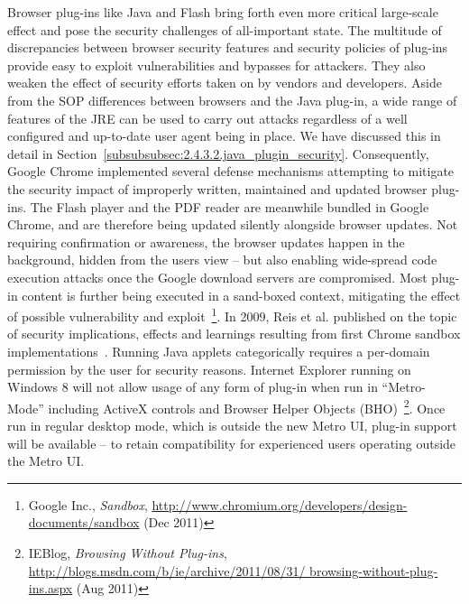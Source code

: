     Browser plug-ins like Java and Flash bring forth even more critical large-scale effect and pose the security challenges of all-important state. The multitude of discrepancies between browser security features and security policies of plug-ins provide easy to exploit vulnerabilities and bypasses for attackers. They also weaken the effect of security efforts taken on by vendors and developers. Aside from the SOP differences between browsers and the Java plug-in, a wide range of features of the JRE can be used to carry out attacks regardless of a well configured and up-to-date user agent being in place. We have discussed this in detail in Section~\ref{subsubsubsec:2.4.3.2.java_plugin_security}. Consequently, Google Chrome implemented several defense mechanisms attempting to mitigate the security impact of improperly written, maintained and updated browser plug-ins. The Flash player and the PDF reader are meanwhile bundled in Google Chrome, and are therefore being updated silently alongside browser updates. 
Not requiring confirmation or awareness, the browser updates happen in the background, hidden from the users view -- but also enabling wide-spread code execution attacks once the Google download servers are compromised. Most plug-in content is further being executed in a sand-boxed context, mitigating the effect of possible vulnerability and exploit~\footnote{Google Inc., \textit{Sandbox}, \url{http://www.chromium.org/developers/design-documents/sandbox} (Dec 2011)}. In 2009, Reis et al. published on the topic of security implications, effects and learnings resulting from first Chrome sandbox implementations~\cite{reis2009browser}. Running Java applets categorically requires a per-domain permission by the user for security reasons. Internet Explorer running on Windows 8 will not allow usage of any form of plug-in when run in ``Metro-Mode'' including ActiveX controls and Browser Helper Objects (BHO)~\footnote{IEBlog, \textit{Browsing Without Plug-ins}, \url{http://blogs.msdn.com/b/ie/archive/2011/08/31/
browsing-without-plug-ins.aspx} (Aug 2011)}. Once run in regular desktop mode, which is outside the new Metro UI, plug-in support will be available -- to retain compatibility for experienced users operating outside the Metro UI. \\

